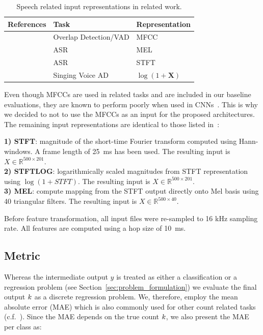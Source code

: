 \begin{table}
  \centering
  \scriptsize
\begin{tabular}{rll}
\toprule
References & Task & Representation \\
\midrule
\cite{geiger13, hagerer17} & Overlap Detection/VAD & MFCC \\
\cite{Graves13, sainath15, marchi17} & ASR & MEL \\
\cite{amodei16} & ASR & STFT \\
\cite{schluter15, schluter16} & Singing Voice AD & \(\log(1 + \mathbf{X})\) \\
\bottomrule
\end{tabular}
\caption{Speech related input representations in related work.}
\label{tab:inputrep}
\end{table}

Even though MFCCs are used in related tasks and are included in our baseline evaluations, they are known to perform poorly when used in CNNs~\cite{Seltzer13}.
This is why we decided to not to use the MFCCs as an input for the proposed architectures.
The remaining input representations are identical to those listed in~\cite{stoeter17}:

\noindent\textbf{1) STFT}: magnitude of the short-time Fourier transform computed using Hann-windows.
A frame length of 25~ms has been used.
The resulting input is \(X \in \mathbb{R}^{500 \times 201}\).\\
\textbf{2) STFTLOG}: logarithmically scaled magnitudes from STFT representation using \(\log(1 + STFT)\).
The resulting input is \(X \in \mathbb{R}^{500 \times 201}\).\\
\textbf{3) MEL}: compute mapping from the STFT output directly onto Mel basis using 40 triangular filters.
The resulting input is \(X \in \mathbb{R}^{500 \times 40}\).
\par
Before feature transformation, all input files were re-sampled to 16 kHz sampling rate. All features are computed using a hop size of 10~ms.

\subsection{Metric}%
\label{ssec:metrics}

Whereas the intermediate output \(y\) is treated as either a classification or a regression problem (see Section~\ref{sec:problem_formulation}) we evaluate the final output \(k \) as a discrete regression problem.
We, therefore, employ the mean absolute error (MAE) which is also commonly used for other count related tasks (c.f.~\cite{zhang15, Rezatofigh16}).
Since the MAE depends on the true count \(k \), we also present the MAE per class as:

